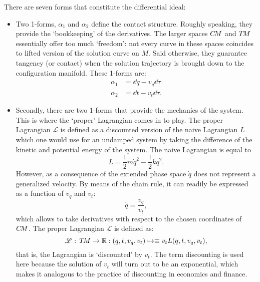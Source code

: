 There are seven forms that constitute the differential ideal:
\begin{itemize}
    \item Two 1-forms, $\alpha_1$ and $\alpha_2$ define the contact structure. Roughly speaking, they provide the `bookkeeping' of the derivatives. The larger spaces $C\!M$ and $T\!M$ essentially offer too much `freedom': not every curve in these spaces coincides to lifted version of the solution curve on $M$. Said otherwise, they guarantee tangency (or contact) when the solution trajectory is brought down to the configuration manifold. These 1-forms are:
    \begin{equation} 
        \begin{split}
            \alpha_1 &= \dd{q} - v_q\dd{\tau}\\
            \alpha_2 &= \dd{t} - v_t\dd{\tau}.
        \end{split}
    \end{equation}
    \item Secondly, there are two 1-forms that provide the mechanics of the system. This is where the `proper' Lagrangian comes in to play. The proper Lagrangian $\mathscr{L}$ is defined as a discounted version of the naive Lagrangian $L$ which one would use for an undamped system by taking the difference of the kinetic and potential energy of the system. The naive Lagrangian is equal to $$ L = \frac{1}{2}m\dot{q}^2 - \frac{1}{2}kq^2. $$
    However, as a consequence of the extended phase space $\dot{q}$ does not represent a generalized velocity. By means of the chain rule, it can readily be expressed as a function of $v_q$ and $v_t$:
    $$ \dot{q} = \frac{v_q}{v_t}, $$
    which allows to take derivatives with respect to the chosen coordinates of $C\!M$. The proper Lagrangian $\mathscr{L}$ is defined as:
        $$ \mathscr{L}:\,T\!M\to\mathbb{R} : (q, t, v_q, v_t) \mapsto \equiv v_t L(q, t, v_q, v_t), $$
    that is, the Lagrangian is `discounted' by $v_t$. The term discounting is used here because the solution of $v_t$ will turn out to be an exponential, which makes it analogous to the practice of discounting in economics and finance.



\end{itemize}

